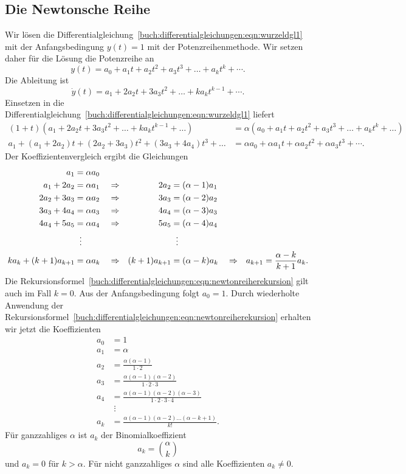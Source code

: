 %
%
\subsection{Die Newtonsche Reihe
\label{buch:differentialgleichungen:subsection:newtonschereihe}}
Wir lösen die
Differentialgleichung~\eqref{buch:differentialgleichungen:eqn:wurzeldgl1}
mit der Anfangsbedingung $y(t)=1$ mit der Potenzreihenmethode.
Wir setzen daher für die Lösung die Potenzreihe an
\[
y(t)
=
a_0 + a_1t + a_2t^2 + a_3t^3 + \dots + a_kt^k + \cdots.
\]
Die Ableitung ist
\[
\dot{y}(t)
=
a_1 + 2a_2t + 3a_3t^2 + \dots  + ka_kt^{k-1} + \cdots .
\]
Einsetzen in die 
Differentialgleichung~\eqref{buch:differentialgleichungen:eqn:wurzeldgl1}
liefert
\begin{align*}
(1+t)
(
a_1 + 2a_2t + 3a_3t^2 + \dots  + ka_kt^{k-1} + \dots
)
&=
\alpha
(
a_0 + a_1t + a_2t^2 + a_3t^3 + \dots + a_kt^k + \dots
)
\\
a_1
+(a_1+2a_2)t
+(2a_2+3a_3)t^2
+(3a_3+4a_4)t^3
+\dots
&=
\alpha a_0 + \alpha a_1t + \alpha a_2t^2 + \alpha a_3t^3 + \cdots.
\end{align*}
Der Koeffizientenvergleich ergibt die Gleichungen
\begin{align}
a_1&=\alpha a_0
\notag
\\
a_1+2a_2 &= \alpha a_1 &&\Rightarrow& 2a_2 &= (\alpha-1) a_1
\notag
\\
2a_2+3a_3 &= \alpha a_2&&\Rightarrow& 3a_3 &= (\alpha-2) a_2
\notag
\\
3a_3+4a_4 &= \alpha a_3&&\Rightarrow& 4a_4 &= (\alpha-3) a_3
\notag
\\
4a_4+5a_5 &= \alpha a_4&&\Rightarrow& 5a_5 &= (\alpha-4) a_4
\notag
\\
&\hspace*{2mm}\vdots
&&&&\hspace*{2mm}\vdots
\notag
\\
ka_k+(k+1)a_{k+1}&=\alpha a_k
&&\Rightarrow& (k+1)a_{k+1} &= (\alpha-k) a_k
&&\Rightarrow&
a_{k+1} = \frac{\alpha-k}{k+1}a_k.
\label{buch:differentialgleichungen:eqn:newtonreiherekursion}
\end{align}
%
Die
Rekursionsformel~\eqref{buch:differentialgleichungen:eqn:newtonreiherekursion}
gilt auch im Fall $k=0$.
Aus der Anfangsbedingung folgt $a_0=1$.
Durch wiederholte Anwendung der 
Rekursionsformel~\eqref{buch:differentialgleichungen:eqn:newtonreiherekursion}
erhalten wir jetzt die Koeffizienten
\begin{align*}
a_0&=1
\\
a_1&=\alpha
\\
a_2&=\frac{\alpha(\alpha-1)}{1\cdot 2}
\\
a_3&=\frac{\alpha(\alpha-1)(\alpha-2)}{1\cdot 2\cdot 3}
\\
a_4&=\frac{\alpha(\alpha-1)(\alpha-2)(\alpha-3)}{1\cdot 2\cdot 3\cdot 4}
\\
&\;\vdots
\\
a_k&=\frac{\alpha(\alpha-1)(\alpha-2)\dots(\alpha-k+1)}{k!}.
\end{align*}
Für ganzzahliges $\alpha$ ist $a_k$ der Binomialkoeffizient
\[
a_k=\binom{\alpha}{k}
\]
und $a_k=0$ für $k>\alpha$.
Für nicht ganzzahliges $\alpha$ sind alle Koeffizienten $a_k\ne 0$.

